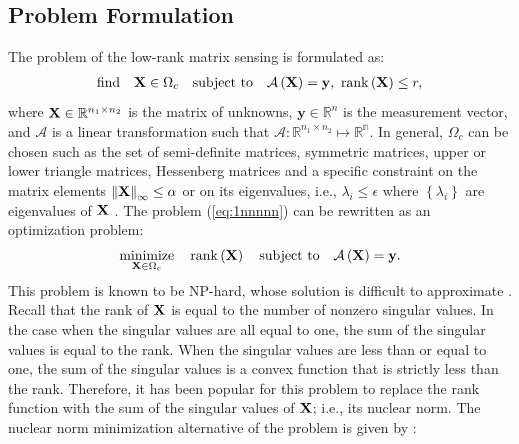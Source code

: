 \documentclass[12pt,draftcls,onecolumn]{IEEEtran}
\begin{document}
\subsection{Problem Formulation}
\label{pr}
The problem of the low-rank matrix sensing is formulated as:
\begin{equation}
\label{eq:1nnnnn}
\begin{aligned}
\text{find}\quad \mbX \in \Omega_{c} \quad
\text{subject to} \quad \mathcal{A}\left(\mbX\right)=\mathbf{y},~ 
\operatorname{rank}\left(\mbX\right)\leq r,
\end{aligned}
\end{equation}\normalsize
where $\mathbf{X}\in \mathbb{R}^{n_{1}\times n_{2}}$ is the matrix of unknowns, $\mathbf{y}\in \mathbb{R}^{n}$ is the measurement vector, and $\mathcal{A}$ is a linear transformation such that $\mathcal{A}:\mathbb{R}^{n_1\times n_2}\mapsto\mathbb{R^{n}}$.
In general, $\Omega_{c}$ can be chosen such as the set of semi-definite matrices, symmetric matrices, upper or lower triangle matrices, Hessenberg matrices and a specific constraint on the matrix elements $\left\|\mathbf{X}\right\|_{\infty}\leq \alpha$ or on its eigenvalues, i.e., $\lambda_{i}\leq \epsilon$ where $\left\{\lambda_{i}\right\}$ are eigenvalues of $\mathbf{X}$ \cite{davenport2016overview,candes2015phase,van1996matrix}. The problem (\ref{eq:1nnnnn}) can be rewritten as an optimization problem:
\begin{equation}
\label{eq:1nnnnnn}
\begin{aligned}
\underset{\mbX \in \Omega_{c}}{\textrm{minimize}}\quad \operatorname{rank}\left(\mbX\right) \quad
\text{subject to} \quad \mathcal{A}\left(\mbX\right)=\mathbf{y}.
\end{aligned}
\end{equation}\normalsize
This problem is known to be NP-hard, whose solution is difficult to approximate \cite{meka2008rank,recht2011null}. Recall that the rank of $\mathbf{X}$ is equal to the number of nonzero singular values. In the
case when the singular values are all equal to one, the sum of the singular values is equal to the rank. When the singular values are less than or equal to one, the sum of the singular values is a convex function that is strictly less than the rank. Therefore, it has been popular for this problem to replace the rank function with
the sum of the singular values of $\mathbf{X}$; i.e., its nuclear norm. The nuclear norm minimization alternative of the problem is given by \cite{cai2010singular,recht2010guaranteed,recht2011null}:
\end{document}
